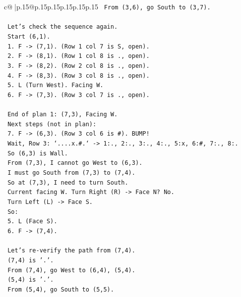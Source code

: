 \documentclass{article}
\begin{document}
{\begin{supertabular}{c@{$\;$}|p{.15\linewidth}@{}p{.15\linewidth}p{.15\linewidth}p{.15\linewidth}p{.15\linewidth}p{.15\linewidth}}
{{{\texttt{       From (3,6), go South to (3,7).} \\
\\ 
\texttt{       Let's check the sequence again.} \\
\texttt{       Start (6,1).} \\
\texttt{       1. F {-}> (7,1). (Row 1 col 7 is S, open).} \\
\texttt{       2. F {-}> (8,1). (Row 1 col 8 is ., open).} \\
\texttt{       3. F {-}> (8,2). (Row 2 col 8 is ., open).} \\
\texttt{       4. F {-}> (8,3). (Row 3 col 8 is ., open).} \\
\texttt{       5. L (Turn West). Facing W.} \\
\texttt{       6. F {-}> (7,3). (Row 3 col 7 is ., open).} \\
\\ 
\texttt{       End of plan 1: (7,3), Facing W.} \\
\texttt{       Next steps (not in plan):} \\
\texttt{       7. F {-}> (6,3). (Row 3 col 6 is \#). BUMP!} \\
\texttt{          Wait, Row 3: `....x.\#.` {-}> 1:., 2:., 3:., 4:., 5:x, 6:\#, 7:., 8:.} \\
\texttt{          So (6,3) is Wall.} \\
\texttt{          From (7,3), I cannot go West to (6,3).} \\
\texttt{          I must go South from (7,3) to (7,4).} \\
\texttt{          So at (7,3), I need to turn South.} \\
\texttt{          Current facing W. Turn Right (R) {-}> Face N? No.} \\
\texttt{          Turn Left (L) {-}> Face S.} \\
\texttt{          So:} \\
\texttt{          5. L (Face S).} \\
\texttt{          6. F {-}> (7,4).} \\
\\ 
\texttt{       Let's re{-}verify the path from (7,4).} \\
\texttt{       (7,4) is '.'.} \\
\texttt{       From (7,4), go West to (6,4), (5,4).} \\
\texttt{       (5,4) is '.'.} \\
\texttt{       From (5,4), go South to (5,5).} \\
}}}
\end{supertabular}}
\end{document}
